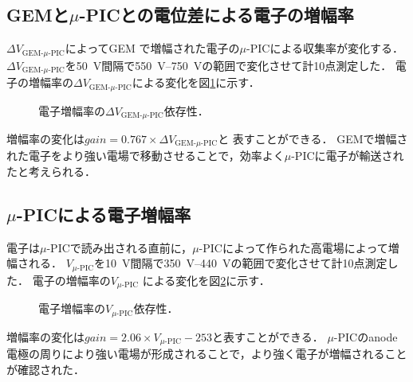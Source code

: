 \documentclass[../master]{subfiles}
\begin{document}

\subsection{GEMと$\mu$-PICとの電位差による電子の増幅率}
$\Delta V_{\text{GEM-}\mu\text{-PIC}}$によってGEM で増幅された電子の$\mu$-PICによる収集率が変化する．
$\Delta V_{\text{GEM-}\mu\text{-PIC}}$を\SI{50}{\volt}間隔で\SIrange{550}{750}{\volt}の範囲で変化させて計10点測定した．
電子の増幅率の$\Delta V_{\text{GEM-}\mu\text{-PIC}}$による変化を図\ref{fig::gain_GEM_uPIC_V_dep}に示す．
\begin{figure}
  \centering
  \scalebox{0.7}{}
  \caption{電子増幅率の$\Delta V_{\text{GEM-}\mu\text{-PIC}}$依存性．}
  \label{fig::gain_GEM_uPIC_V_dep}
\end{figure}
増幅率の変化は$\mathit{gain} = 0.767\times{\Delta V_{\text{GEM-}\mu\text{-PIC}}}$と
表すことができる．
GEMで増幅された電子をより強い電場で移動させることで，効率よく$\mu$-PICに電子が輸送されたと考えられる．

\subsection{$\mu$-PICによる電子増幅率}
電子は$\mu$-PICで読み出される直前に，$\mu$-PICによって作られた高電場によって増幅される．
$V_{\mu\text{-PIC}}$を\SI{10}{\volt}間隔で\SIrange{350}{440}{\volt}の範囲で変化させて計10点測定した．
電子の増幅率の$V_{\mu\text{-PIC}}$ による変化を図\ref{fig::gain_uPIC_V_dep}に示す．
\begin{figure}
  \centering
  \scalebox{0.7}{}
  \caption{電子増幅率の$V_{\mu\text{-PIC}}$依存性．}
  \label{fig::gain_uPIC_V_dep}
\end{figure}
増幅率の変化は$\mathit{gain} = 2.06\times{V_{\mu\text{-PIC}}}-253$と表すことができる．
$\mu$-PICのanode 電極の周りにより強い電場が形成されることで，より強く電子が増幅されることが確認された．
\end{document}
